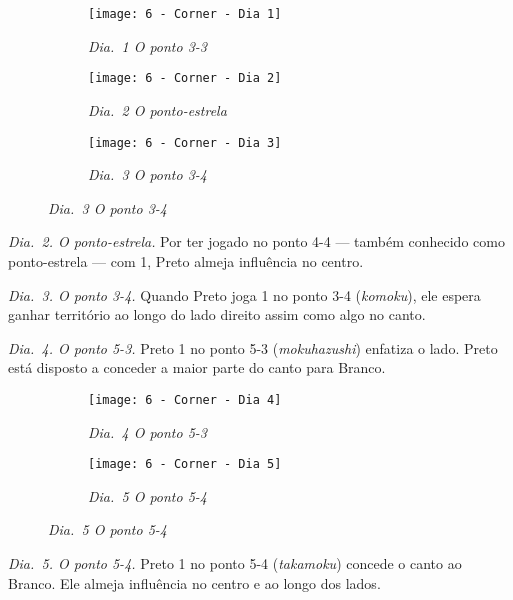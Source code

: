 \begin{figure}[h!]
    \centering
    \begin{subfigure}[t]{.3\textwidth}
        \centering
        \texttt{[image: 6 - Corner - Dia 1]}
        \captionsetup{justification=centering}
        \caption*{\emph{Dia.\@~1 O ponto 3-3}}
    \end{subfigure}
    \hfill
    \begin{subfigure}[t]{.3\textwidth}
        \centering
        \texttt{[image: 6 - Corner - Dia 2]}
        \captionsetup{justification=centering}
        \caption*{\emph{Dia.\@~2 O ponto-estrela}}
    \end{subfigure}
    \hfill
    \begin{subfigure}[t]{.3\textwidth}
        \centering
        \texttt{[image: 6 - Corner - Dia 3]}
        \captionsetup{justification=centering}
        \caption*{\emph{Dia.\@~3 O ponto 3-4}}
    \end{subfigure}
\end{figure}

\emph{Dia.\@~2. O ponto-estrela.} Por ter jogado no ponto 4-4 --- também conhecido como ponto-estrela --- com 1, Preto almeja influência no centro.

\emph{Dia.\@~3. O ponto 3-4.} Quando Preto joga 1 no ponto 3-4 (\emph{komoku}), ele espera ganhar território ao longo do lado direito assim como algo no canto.

\emph{Dia.\@~4. O ponto 5-3.} Preto 1 no ponto 5-3 (\emph{mokuhazushi}) enfatiza o lado. Preto está disposto a conceder a maior parte do canto para Branco.


\begin{figure}[h!]
    \centering
    \begin{subfigure}[t]{.3\textwidth}
        \centering
        \texttt{[image: 6 - Corner - Dia 4]}
        \captionsetup{justification=centering}
        \caption*{\emph{Dia.\@~4 O ponto 5-3}}
    \end{subfigure}
    \hspace{1cm}
    \begin{subfigure}[t]{.3\textwidth}
        \centering
        \texttt{[image: 6 - Corner - Dia 5]}
        \captionsetup{justification=centering}
        \caption*{\emph{Dia.\@~5 O ponto 5-4}}
    \end{subfigure}
\end{figure}

\emph{Dia.\@~5. O ponto 5-4.} Preto 1 no ponto 5-4 (\emph{takamoku}) concede o canto ao Branco. Ele almeja influência no centro e ao longo dos lados.

